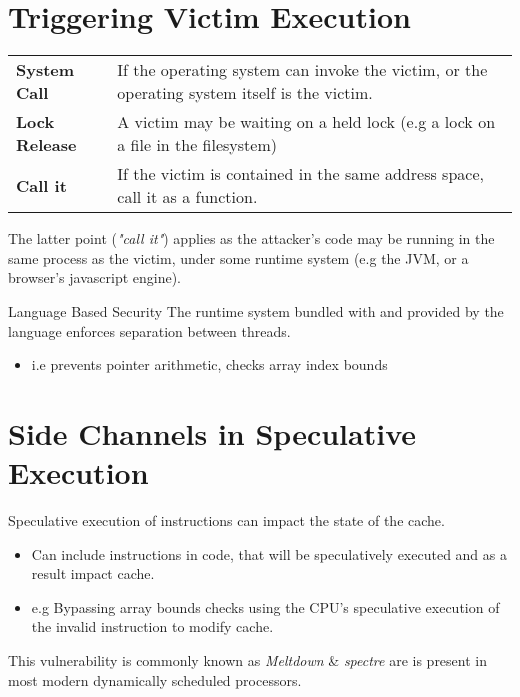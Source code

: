 \section{Triggering Victim Execution}
\begin{center}
    \begin{tabular}{p{} p{}}
        \textbf{System Call} & If the operating system can invoke the victim, or the operating system itself is the victim. \\
        \textbf{Lock Release} & A victim may be waiting on a held lock (e.g a lock on a file in the filesystem) \\
        \textbf{Call it} & If the victim is contained in the same address space, call it as a function. \\
    \end{tabular}
\end{center}
The latter point (\textit{"call it"}) applies as the attacker's code may be running in the same process as the victim, under some runtime system (e.g the JVM, or a browser's javascript engine).
\begin{definitionbox}{Language Based Security}
    The runtime system bundled with and provided by the language enforces separation between threads.
    \begin{itemize}
        \item i.e prevents pointer arithmetic, checks array index bounds
    \end{itemize}
\end{definitionbox}

\section{Side Channels in Speculative Execution}
Speculative execution of instructions can impact the state of the cache.
\begin{itemize}
    \item Can include instructions in code, that will be speculatively executed and as a result impact cache.
    \item e.g Bypassing array bounds checks using the CPU's speculative execution of the invalid instruction to modify cache.
\end{itemize}
This vulnerability is commonly known as \textit{Meltdown} \& \textit{spectre} are is present in most modern dynamically scheduled processors.


